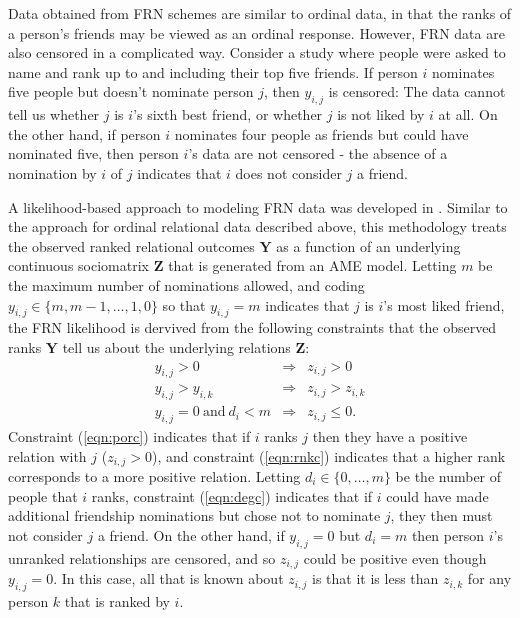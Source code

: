 \documentclass[11pt]{article}\usepackage[]{graphicx}\usepackage[]{color}
\newcommand{\bl}[1]{{\mathbf #1}}
\begin{document}
Data obtained from FRN schemes are similar to ordinal data, 
in that the ranks of a person's friends may be viewed as 
an ordinal response. However, FRN data are also censored
in a complicated way. 
Consider a study where people were asked to name and rank up to 
and including their top five friends. If person $i$ 
nominates five people but doesn't nominate person $j$, then $y_{i,j}$ is 
censored: The data cannot tell us whether $j$ is $i$'s sixth best 
friend, or whether $j$ is not liked by $i$ at all. 
On the other hand, if person $i$ nominates four people as friends 
but could have nominated five, then 
person $i$'s data are not censored -  the absence of a nomination 
by $i$ of $j$ indicates that $i$ does not consider $j$ a friend. 

A likelihood-based approach to modeling 
FRN data was developed in 
\citet{hoff_fosdick_volfovsky_stovel_2013}. 
Similar to the approach for ordinal relational data described above, 
this methodology treats the observed ranked relational outcomes $\bl Y$ 
as a function of an underlying continuous sociomatrix $\bl Z$ that 
is generated from an 
AME model. 
Letting $m$ be the maximum number of nominations allowed, and 
coding $y_{i,j} \in \{ m,m-1,\ldots, 1,0\} 
$ so that $y_{i,j}=m$ indicates that $j$ is $i$'s most liked friend, 
the FRN likelihood is dervived from the following constraints that the 
observed ranks $\bl Y$ tell us about the underlying relations  $\bl Z$:
\begin{eqnarray}
y_{i,j}> 0 &\Rightarrow & z_{i,j}>0  \label{eqn:porc}\\
y_{i,j}  > y_{i,k} & \Rightarrow &  z_{i,j} > z_{i,k} 
  \label{eqn:rnkc}\\ 
y_{i,j} = 0  \ \mbox{and} \  
 d_i < m &\Rightarrow & 
    z_{i,j}\leq 0  \label{eqn:degc}. 
\end{eqnarray}
Constraint (\ref{eqn:porc}) 
indicates that 
if $i$ ranks $j$ then they have a positive relation with $j$ ($z_{i,j}>0$), 
and constraint (\ref{eqn:rnkc})  indicates that 
a higher rank corresponds to a more positive relation. 
Letting $d_i\in \{ 0,\ldots, m\}$ be the number of people 
that $i$ ranks, constraint (\ref{eqn:degc})  
indicates that if 
$i$ could have made additional friendship nominations 
but chose not to nominate $j$, 
they then must not consider $j$ a friend. 
On the other hand, if
$y_{i,j}=0$ but $d_i = m$ then person $i$'s unranked relationships
are censored, and so $z_{i,j}$ could be positive
even though
$y_{i,j}=0$.  In this case, all that is known about
$z_{i,j}$ is that it is less than $z_{i,k}$ for any person
$k$ that is ranked by $i$.
\end{document}
